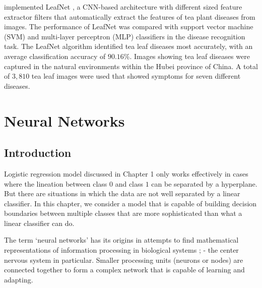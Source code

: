 \documentclass[12pt]{report}
\numberwithin{equation}{section}
\begin{document}
{\cite{chen2019visual}} implemented LeafNet {\cite{barre2017leafnet}}, a CNN-based architecture with different sized feature extractor filters that automatically extract the features of tea plant diseases from images. The performance of LeafNet was compared with support vector machine (SVM) and multi-layer perceptron (MLP) classifiers in the disease recognition task. The LeafNet algorithm identified tea leaf diseases most accurately, with an average classification accuracy of $90.16\%$. Images showing tea leaf diseases were captured  in the natural environments  within the Hubei province of China. A total of $3,810$ tea leaf images were used that showed symptoms for seven different diseases. 









\chapter{Neural Networks}
\setcounter{section}{-1}
\section{Introduction}
Logistic regression model discussed in Chapter 1 only works effectively in cases where the lineation between class $0$ and class $1$ can be separated by a hyperplane. But there are situations in which the data are not well separated by a linear classifier. In this chapter, we consider a model that is capable of building decision boundaries between multiple classes that are more sophisticated than what a linear classifier can do. %

The term `neural networks' has its origins in attempts to find mathematical representations of information processing in biological systems {\cite{McCulloch1943}}; {\cite{Rosenblatt58theperceptron}} - the center nervous system in particular. Smaller processing units (neurons or nodes) are connected together to form a complex network that is capable of learning and adapting. %
\end{document}
